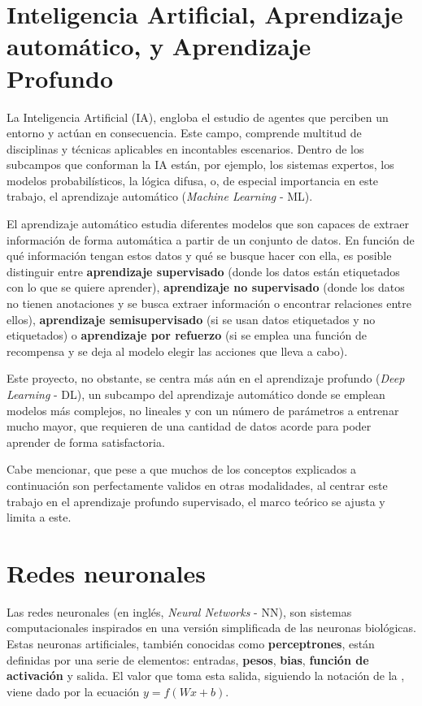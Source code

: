 
\section{Inteligencia Artificial, Aprendizaje automático, y Aprendizaje Profundo}
La Inteligencia Artificial (IA), engloba el estudio de agentes que perciben un entorno y actúan en consecuencia. Este campo, comprende multitud de disciplinas y técnicas aplicables en incontables escenarios. Dentro de los subcampos que conforman la IA están, por ejemplo, los sistemas expertos, los modelos probabilísticos, la lógica difusa, o, de especial importancia en este trabajo, el aprendizaje automático (\textit{Machine Learning} - ML). 

El aprendizaje automático estudia diferentes modelos que son capaces de extraer información de forma automática a partir de un conjunto de datos. En función de qué información tengan estos datos y qué se busque hacer con ella, es posible distinguir entre \textbf{aprendizaje supervisado} \cite{supervisedlearning} (donde los datos están etiquetados con lo que se quiere aprender), \textbf{aprendizaje no supervisado} \cite{unsupervisedlearning} (donde los datos no tienen anotaciones y se busca extraer información o encontrar relaciones entre ellos), \textbf{aprendizaje semisupervisado} \cite{semisupervisedlearning} (si se usan datos etiquetados y no etiquetados) o \textbf{aprendizaje por refuerzo} \cite{reinforcementlearning} (si se emplea una función de recompensa y se deja al modelo elegir las acciones que lleva a cabo).

Este proyecto, no obstante, se centra más aún en el aprendizaje profundo (\textit{Deep Learning} - DL), un subcampo del aprendizaje automático donde se emplean modelos más complejos, no lineales y con un número de parámetros a entrenar mucho mayor, que requieren de una cantidad de datos acorde para poder aprender de forma satisfactoria.

Cabe mencionar, que pese a que muchos de los conceptos explicados a continuación son perfectamente validos en otras modalidades, al centrar este trabajo en el aprendizaje profundo supervisado, el marco teórico se ajusta y limita a este. 

\section{Redes neuronales}
Las redes neuronales \cite{perceptron} (en inglés, \textit{Neural Networks} - NN), son sistemas computacionales inspirados en una versión simplificada de las neuronas biológicas. Estas neuronas artificiales, también conocidas como \textbf{perceptrones}, están definidas por una serie de elementos: entradas, \textbf{pesos}, \textbf{bias}, \textbf{función de activación} y salida. El valor que toma esta salida, siguiendo la notación de la , viene dado por la ecuación $y = f(Wx + b)$.

